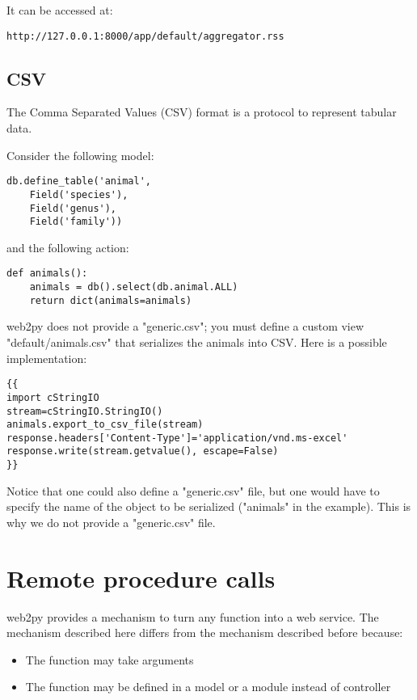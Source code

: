 \documentclass[justified,sixbynine,notoc]{tufte-book}
\def\inxx#1{\index{#1}}
\begin{document}
\begin{fullwidth}
It can be accessed at:

\begin{lstlisting}[keywords={}]
http://127.0.0.1:8000/app/default/aggregator.rss
\end{lstlisting}

\goodbreak\subsection{CSV}

\inxx{CSV}

The Comma Separated Values (CSV) format is a protocol to represent tabular data.

Consider the following model:
\begin{lstlisting}
db.define_table('animal',
    Field('species'),
    Field('genus'),
    Field('family'))
\end{lstlisting}
\noindent and the following action:
\begin{lstlisting}
def animals():
    animals = db().select(db.animal.ALL)
    return dict(animals=animals)
\end{lstlisting}
\noindent web2py does not provide a "generic.csv"; you must define a custom view "default/animals.csv"
that serializes the animals into CSV. Here is a possible implementation:
\begin{lstlisting}[keywords={}]
{{
import cStringIO
stream=cStringIO.StringIO()
animals.export_to_csv_file(stream)
response.headers['Content-Type']='application/vnd.ms-excel'
response.write(stream.getvalue(), escape=False)
}}
\end{lstlisting}

Notice that one could also define a "generic.csv" file, but one would have to specify the name of the object to be serialized ("animals" in the example). This is why we do not provide a "generic.csv" file.

\goodbreak\section{Remote procedure calls}

\inxx{RPC}
\noindent web2py provides a mechanism to turn any function into a web service.
The mechanism described here differs from the mechanism described before because:
\begin{itemize}
\item The function may take arguments

\item The function may be defined in a model or a module instead of controller


\end{itemize}
\end{fullwidth}
\end{document}
